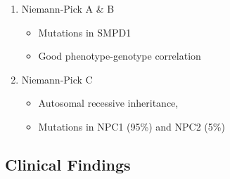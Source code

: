 \documentclass{scrartcl}
\begin{document}
\begin{enumerate}
\begin{enumerate}
\item Niemann-Pick A \& B
\label{sec:org6dfc9dc}
\begin{itemize}
\item Mutations in SMPD1
\item Good phenotype-genotype correlation
\end{itemize}
\item Niemann-Pick C
\label{sec:orgfdbce9f}
\begin{itemize}
\item Autosomal recessive inheritance,
\item Mutations in NPC1 (95\%) and NPC2 (5\%)
\end{itemize}
\end{enumerate}
\end{enumerate}

\subsection{Clinical Findings}
\label{sec:org8a45260}
\end{document}
